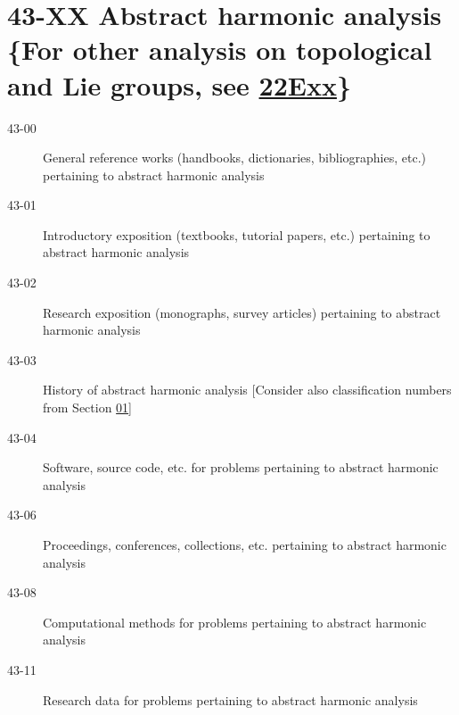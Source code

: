 \documentclass[letterpaper]{article}
\begin{document}
\section*{43-XX Abstract harmonic analysis \{For other analysis on topological and Lie groups, see \hyperref[22Exx]{22Exx}\} }\label{43-XX}
\begin{description}
\item [43-00]\label{43-00} General reference works (handbooks, dictionaries, bibliographies, etc.) pertaining to abstract harmonic analysis
\item [43-01]\label{43-01} Introductory exposition (textbooks, tutorial papers, etc.) pertaining to abstract harmonic analysis
\item [43-02]\label{43-02} Research exposition (monographs, survey articles) pertaining to abstract harmonic analysis
\item [43-03]\label{43-03} History of abstract harmonic analysis [Consider also classification numbers from Section \hyperref[01-XX]{01}]
\item [43-04]\label{43-04} Software, source code, etc. for problems pertaining to abstract harmonic analysis
\item [43-06]\label{43-06} Proceedings, conferences, collections, etc. pertaining to abstract harmonic analysis
\item [43-08]\label{43-08} Computational methods for problems pertaining to abstract harmonic analysis
\item [43-11]\label{43-11} Research data for problems pertaining to abstract harmonic analysis
\end{description}
\end{document}

